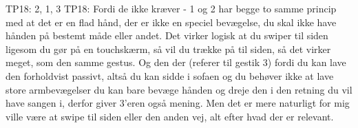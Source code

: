 TP18: 2, 1, 3
TP18: Fordi de ikke kræver - 1 og 2 har begge to samme princip med at det er en flad hånd, der er ikke en speciel bevægelse, du skal ikke have hånden på bestemt måde eller andet. Det virker logisk at du swiper til siden ligesom du gør på en touchskærm, så vil du trække på til siden, så det virker meget, som den samme gestus. Og den der (referer til gestik 3) fordi du kan lave den forholdvist passivt, altså du kan sidde i sofaen og du behøver ikke at lave store armbevægelser du kan bare bevæge hånden og dreje den i den retning du vil have sangen i, derfor giver 3’eren også mening. Men det er mere naturligt for mig ville være at swipe til siden eller den anden vej, alt efter hvad der er relevant.   






















